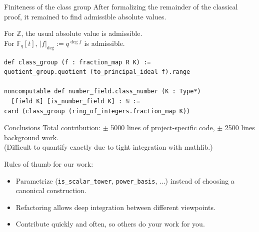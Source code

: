 \documentclass{beamer}
\newcommand{\lean}[1]{\texttt{#1}\xspace}
\newcommand*{\Fq}[1][q]{\mathbb{F}_{#1}}
\newcommand{\mathlib}{\textsf{mathlib}\xspace}
\newcommand{\Z}{\mathbb{Z}}
\begin{document}
\begin{frame}[fragile]{Finiteness of the class group}
	After formalizing the remainder of the classical proof,
	it remained to find admissible absolute values.

	For $\Z$, the usual absolute value is admissible.\\
	For $\Fq[q][t]$, $\lvert f\rvert_{\deg}:=q^{\deg f}$ is admissible.

\vspace{\baselineskip}
\pause
\begin{lstlisting}
def class_group (f : fraction_map R K) :=
quotient_group.quotient (to_principal_ideal f).range

noncomputable def number_field.class_number (K : Type*)
  [field K] [is_number_field K] : ℕ :=
card (class_group (ring_of_integers.fraction_map K))
\end{lstlisting}
\end{frame}

\begin{frame}{Conclusions}
	Total contribution: $\pm$ 5000 lines of project-specific code, $\pm$ 2500 lines background work.\\
	(Difficult to quantify exactly due to tight integration with \mathlib.)

\pause
	Rules of thumb for our work:
	\begin{itemize}
		\item Parametrize (\lean{is\_scalar\_tower}, \lean{power\_basis}, ...) instead of choosing a canonical construction.
		\item Refactoring allows deep integration between different viewpoints.
		\item Contribute quickly and often, so others do your work for you.
	\end{itemize}

\end{frame}
\end{document}

